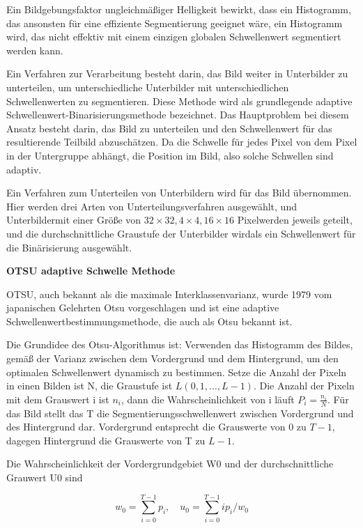 Ein Bildgebungsfaktor ungleichmäßiger Helligkeit bewirkt, dass ein Histogramm, das ansonsten für eine effiziente Segmentierung geeignet wäre, ein Histogramm wird, das nicht effektiv mit einem einzigen globalen Schwellenwert segmentiert werden kann.

Ein Verfahren zur Verarbeitung besteht darin, das Bild weiter in Unterbilder zu unterteilen, um unterschiedliche Unterbilder mit unterschiedlichen Schwellenwerten zu segmentieren. Diese Methode wird als grundlegende adaptive Schwellenwert-Binarisierungsmethode bezeichnet. Das Hauptproblem bei diesem Ansatz besteht darin, das Bild zu unterteilen und den Schwellenwert für das resultierende Teilbild abzuschätzen. Da die Schwelle für jedes Pixel von dem Pixel in der Untergruppe abhängt, die Position im Bild, also solche Schwellen sind adaptiv. 

Ein Verfahren zum Unterteilen von Unterbildern wird für das Bild übernommen. Hier werden drei Arten von Unterteilungsverfahren ausgewählt, und Unterbildermit einer Größe von $ 32\times32,4 \times4,16\times16 $ Pixelwerden jeweils geteilt, und die durchschnittliche Graustufe der Unterbilder wirdals ein Schwellenwert für die Binärisierung ausgewählt.


\textbf{OTSU adaptive Schwelle Methode}

OTSU\cite{Ostu}, auch bekannt als die maximale Interklassenvarianz, wurde 1979 vom japanischen Gelehrten Otsu vorgeschlagen und ist eine adaptive Schwellenwertbestimmungsmethode, die auch als Otsu bekannt ist.

Die Grundidee des Otsu-Algorithmus ist: Verwenden das Histogramm des Bildes, gemäß der Varianz zwischen dem Vordergrund und dem Hintergrund, um den optimalen Schwellenwert dynamisch zu bestimmen. Setze die Anzahl der Pixeln in einen Bilden ist N, die Graustufe ist $ L(0,1,...,L-1) $. Die Anzahl der Pixeln mit dem Grauswert i ist $ n_{i} $, dann die Wahrscheinlichkeit von i läuft $ P_{i} = \frac{n_{i}}{N} $. Für das Bild stellt das T die Segmentierungsschwellenwert zwischen Vordergrund und des Hintergrund dar. Vordergrund entsprecht die Grauswerte von 0 zu $ T-1 $, dagegen Hintergrund die Grauswerte von T zu $ L -1 $.

Die Wahrscheinlichkeit der Vordergrundgebiet W0 und der durchschnittliche Grauwert U0 sind

\begin{equation}
  w_{0} = \sum_{i=0}^{T-1} p_{i},\quad u_{0} = \sum_{i=0}^{T-1} ip_{i}/w_{0}
\end{equation}

